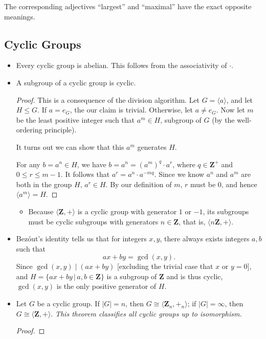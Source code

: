 \documentclass[11pt]{article}
\newcommand{\where}{\,|\,}
\newcommand{\Z}{\mathbf{Z}}
\newcommand{\la}{\langle}
\newcommand{\ra}{\rangle}
\newcommand{\abs}[1]{\lvert #1 \rvert}
\newcommand{\gen}[1]{\langle #1 \rangle}
\renewcommand{\simeq}{\cong}
\begin{document}
The corresponding adjectives ``largest'' and ``maximal'' have the exact opposite meanings.

\subsection{Cyclic Groups}
\begin{itemize}
    \item Every cyclic group is abelian. This follows from the associativity of $\cdot$.
    \item A subgroup of a cyclic group is cyclic.
    \begin{proof}
        This is a consequence of the division algorithm. Let $G = \gen{a}$, and let $H \leq G$. If $a = e_G$, the our claim is trivial. Otherwise, let $a \neq e_G$. Now let $m$ be the least positive integer such that $a^m \in H$, subgroup of $G$ (by the well-ordering principle).

        It turns out we can show that this $a^m$ generates $H$.
        
        For any $b = a^n \in H$, we have $b = a^n = (a^m)^q \cdot a^r$, where $q \in \Z^+$ and $0 \leq r \leq m-1$. It follows that $a^r = a^n \cdot a^{-mq}$. Since we know $a^n$ and $a^m$ are both in the group $H$, $a^r \in H$. By our definition of $m$, $r$ must be 0, and hence $\la a^m\ra = H$.
    \end{proof}
    \begin{itemize}
        \item Because $\la \Z,+ \ra$ is a cyclic group with generator $1$ or $-1$, its subgroups must be cyclic subgroups with generators $n \in \Z$, that is, $\la n\Z, + \ra$.
    \end{itemize}
    \item Bezóut's identity tells us that for integers $x,y$, there always exists integers $a,b$ such that \[ax+by = \gcd(x,y).\] Since $\gcd(x,y) \mid (ax+by)$ [excluding the trivial case that $x$ or $y = 0$], and $H = \{ax+by \where a,b \in \Z\}$ is a subgroup of $\Z$ and is thus cyclic, $\gcd(x,y)$ is the only positive generator of $H$.
    \item Let $G$ be a cyclic group. If $\abs{G} = n$, then $G \simeq \la \Z_n,+_n \ra$; if $\abs{G} = \infty$, then $G \simeq \la \Z,+ \ra$. \emph{This theorem classifies all cyclic groups up to isomorphism.}
    \begin{proof}
        
    \end{proof}
\end{itemize}
\end{document}
